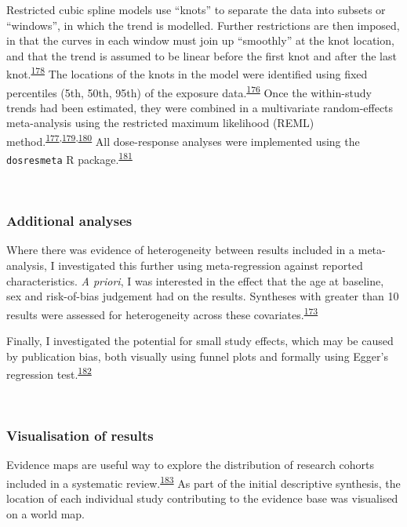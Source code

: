 \documentclass[a4paper, twoside]{templates/ociamthesis}
\begin{document}
Restricted cubic spline models use ``knots'' to separate the data into subsets or ``windows'', in which the trend is modelled. Further restrictions are then imposed, in that the curves in each window must join up ``smoothly'' at the knot location, and that the trend is assumed to be linear before the first knot and after the last knot.\textsuperscript{\protect\hyperlink{ref-gauthier2020}{178}} The locations of the knots in the model were identified using fixed percentiles (5th, 50th, 95th) of the exposure data.\textsuperscript{\protect\hyperlink{ref-durrleman1989}{176}} Once the within-study trends had been estimated, they were combined in a multivariate random-effects meta-analysis using the restricted maximum likelihood (REML) method.\textsuperscript{\protect\hyperlink{ref-liu2009}{177},\protect\hyperlink{ref-white2009}{179},\protect\hyperlink{ref-gasparrini2012}{180}} All dose-response analyses were implemented using the \texttt{dosresmeta} R package.\textsuperscript{\protect\hyperlink{ref-crippa2016}{181}}

~

\hypertarget{additional-analyses}{%
\subsubsection{Additional analyses}\label{additional-analyses}}

Where there was evidence of heterogeneity between results included in a meta-analysis, I investigated this further using meta-regression against reported characteristics. \emph{A priori}, I was interested in the effect that the age at baseline, sex and risk-of-bias judgement had on the results. Syntheses with greater than 10 results were assessed for heterogeneity across these covariates.\textsuperscript{\protect\hyperlink{ref-deeks2019}{173}}

Finally, I investigated the potential for small study effects, which may be caused by publication bias, both visually using funnel plots and formally using Egger's regression test.\textsuperscript{\protect\hyperlink{ref-sterne2011}{182}}

~

\hypertarget{sys-rev-visualising-results}{%
\subsubsection{Visualisation of results}\label{sys-rev-visualising-results}}

Evidence maps are useful way to explore the distribution of research cohorts included in a systematic review.\textsuperscript{\protect\hyperlink{ref-saran2018}{183}} As part of the initial descriptive synthesis, the location of each individual study contributing to the evidence base was visualised on a world map.
\end{document}
